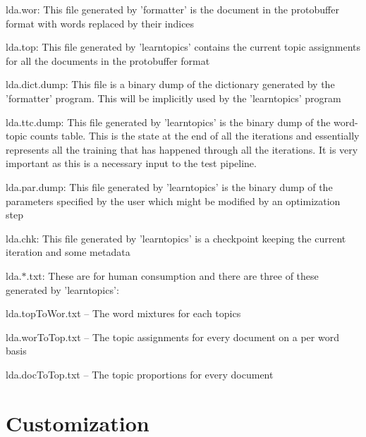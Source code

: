 \begin{DoxyEnumerate}
\item 

lda.wor: This file generated by 'formatter' is the document in the protobuffer format with words replaced by their indices 
\item 

lda.top: This file generated by 'learntopics' contains the current topic assignments for all the documents in the protobuffer format 
\item 

lda.dict.dump: This file is a binary dump of the dictionary generated by the 'formatter' program. This will be implicitly used by the 'learntopics' program 
\item 

lda.ttc.dump: This file generated by 'learntopics' is the binary dump of the word-\/topic counts table. This is the state at the end of all the iterations and essentially represents all the training that has happened through all the iterations. It is very important as this is a necessary input to the test pipeline. 
\item 

lda.par.dump: This file generated by 'learntopics' is the binary dump of the parameters specified by the user which might be modified by an optimization step 
\item 

lda.chk: This file generated by 'learntopics' is a checkpoint keeping the current iteration and some metadata 
\item 

lda.$\ast$.txt: These are for human consumption and there are three of these generated by 'learntopics': 
\begin{DoxyEnumerate}
\item 

lda.topToWor.txt – The word mixtures for each topics 
\item 

lda.worToTop.txt – The topic assignments for every document on a per word basis 
\item 

lda.docToTop.txt – The topic proportions for every document 
\end{DoxyEnumerate}
\end{DoxyEnumerate}\hypertarget{single__machine__usage_customizations}{}\section{Customization}\label{single__machine__usage_customizations}
